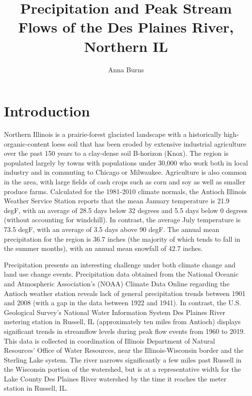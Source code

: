 \documentclass{article}\usepackage[]{graphicx}\usepackage[]{color}
\author{Anna Burns}
\title{Precipitation and Peak Stream Flows of the Des Plaines River, Northern IL}
\begin{document}
\maketitle

\section*{Introduction}

  Northern Illinois is a prairie-forest glaciated landscape with a historically high-organic-content loess soil that has been eroded by extensive industrial agriculture over the past 150 years to a clay-dense soil B-horizon (Knox).  The region is populated largely by towns with populations under 30,000 who work both in local industry and in commuting to Chicago or Milwaukee.  Agriculture is also common in the area, with large fields of cash crops such as corn and soy as well as smaller produce farms.  Calculated for the 1981-2010 climate normals, the Antioch Illinois Weather Service Station reports that the mean January temperature is 21.9 degF, with an average of 28.5 days below 32 degrees and 5.5 days below 0 degrees (without accounting for windchill).  In contrast, the average July temperature is 73.5 degF, with an average of 3.5 days above 90 degF.  The annual mean precipitation for the region is 36.7 inches (the majority of which tends to fall in the summer months), with an annual mean snowfall of 42.7 inches.  

Precipitation presents an interesting challenge under both climate change and land use change events. Precipitation data obtained from the National Oceanic and Atmospheric Association's (NOAA) Climate Data Online regarding the Antioch weather station reveals lack of general precipitation trends between 1901 and 2008 (with a gap in the data between 1922 and 1941).  In contrast, the U.S. Geological Survey's National Water Information System Des Plaines River metering station in Russell, IL (approximately ten miles from Antioch) displays significant trends in streamflow levels during peak flow events from 1960 to 2019.  This data is collected in coordination of Illinois Department of Natural Resources' Office of Water Resources, near the Illinois-Wisconsin border and the Sterling Lake system.  The river narrows significantly a few miles past Russell in the Wisconsin portion of the watershed, but is at a representative width for the Lake County Des Plaines River watershed by the time it reaches the meter station in Russell, IL.
\end{document}
